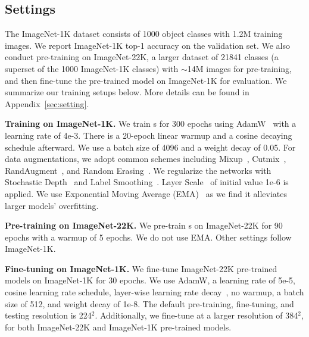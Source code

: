 \documentclass[10pt,twocolumn,letterpaper]{article}
\renewcommand{\paragraph}[1]{\vspace{1.25mm}\noindent\textbf{#1}}
\begin{document}
\subsection{Settings}
The ImageNet-1K dataset consists of 1000 object classes with 1.2M training images. We report ImageNet-1K top-1 accuracy on the validation set. We also conduct pre-training on ImageNet-22K, a larger dataset of 21841 classes (a superset of the 1000 ImageNet-1K classes) with $\sim$14M images for pre-training, and then fine-tune the pre-trained model on ImageNet-1K for evaluation.  We summarize our training setups below. More details can be found in Appendix~\ref{sec:setting}. 

\paragraph{Training on ImageNet-1K.} We train \cnn{}s for 300 epochs using AdamW~\cite{Loshchilov2019} with a learning rate of 4e-3. There is a 20-epoch linear warmup and a cosine decaying schedule afterward. We use a batch size of 4096 and a weight decay of 0.05. For data augmentations, we adopt common schemes including Mixup~\cite{Zhang2018a}, Cutmix~\cite{Yun2019}, RandAugment~\cite{Cubuk2020}, and Random Erasing~\cite{Zhong2020}. We regularize the networks with Stochastic Depth~\cite{Huang2016deep} and Label Smoothing~\cite{Szegedy2016a}. Layer Scale~\cite{Touvron2021GoingDW} of initial value 1e-6 is applied. We use Exponential Moving Average (EMA)~\cite{Polyak1992} as we find it alleviates larger models' overfitting.

\paragraph{Pre-training on ImageNet-22K.} We pre-train \cnn{}s on ImageNet-22K for 90 epochs with a warmup of 5 epochs. We do not use EMA. Other settings follow ImageNet-1K.

\paragraph{Fine-tuning on ImageNet-1K.}
We fine-tune ImageNet-22K pre-trained models on ImageNet-1K for 30 epochs. We use AdamW, a learning rate of 5e-5, cosine learning rate schedule, layer-wise learning rate decay~\cite{Clark2020,Bao2021}, no warmup, a batch size of 512, and weight decay of 1e-8. 
The default pre-training, fine-tuning, and testing resolution is 224$^2$. Additionally, we fine-tune at a larger resolution of 384$^2$, for both ImageNet-22K and ImageNet-1K pre-trained models. 
\end{document}
